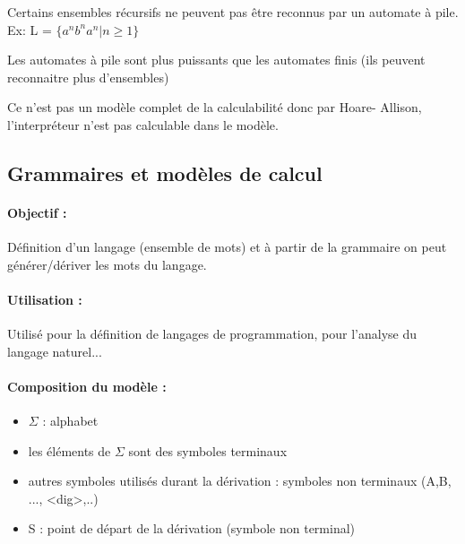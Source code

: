 \begin{myprop}
	Certains ensembles récursifs ne peuvent pas être reconnus par un automate 
	à pile. Ex: L = $\{a^n b^n a^n | n\geq 1\}$
\end{myprop}

\begin{myprop}
	Les automates à pile sont plus puissants que les automates finis (ils 
	peuvent reconnaitre plus d'ensembles)
\end{myprop}

\begin{myprop}
	Ce n'est pas un modèle complet de la calculabilité donc par Hoare-
	Allison, l'interpréteur n'est pas calculable dans le modèle.
\end{myprop}


\subsection{Grammaires et modèles de calcul}
\label{sub:grammaires_et_mod_les_de_calcul}

\paragraph{Objectif :}
Définition d'un langage (ensemble de mots) et à partir de la grammaire on peut 
générer/dériver les mots du langage.

\paragraph{Utilisation :} Utilisé pour la définition de langages de 
programmation, pour l'analyse du langage naturel...

\paragraph{Composition du modèle :}

\begin{itemize}
	\item $\Sigma$ : alphabet
	\item les éléments de $\Sigma$ sont des symboles terminaux
	\item autres symboles utilisés durant la dérivation : symboles non 
		terminaux (A,B, ..., <dig>,..)
	\item S : point de départ de la dérivation (symbole non terminal)
\end{itemize}

